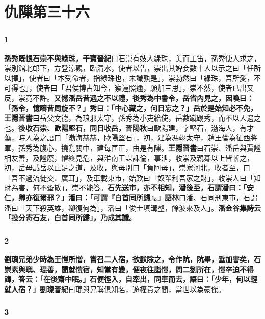 \chapter{仇隟第三十六}

\subsection*{1}

\textbf{孫秀既恨石崇不與綠珠，}{\footnotesize \textbf{干寶晉紀}曰石崇有妓人綠珠，美而工笛，孫秀使人求之，崇別館北邙下，方登涼觀，臨清水，使者以告，崇出其婢妾數十人以示之曰「任所以擇」，使者曰「本受命者，指綠珠也，未識孰是」，崇勃然曰「綠珠，吾所愛，不可得也」，使者曰「君侯博古知今，察遠照邇，願加三思」，崇不然，使者已出又反，崇竟不許。}\textbf{又憾潘岳昔遇之不以禮，後秀為中書令，岳省內見之，因喚曰：「孫令，憶疇昔周旋不？」秀曰：「中心藏之，何日忘之？」岳於是始知必不免，}{\footnotesize \textbf{王隱晉書}曰岳父文德，為琅邪太守，孫秀為小吏給使，岳數蹴蹋秀，而不以人遇之也。}\textbf{後收石崇、歐陽堅石，同日收岳，}{\footnotesize \textbf{晉陽秋}曰歐陽建，字堅石，渤海人，有才藻，時人為之語曰「渤海赫赫，歐陽堅石」，初，建為馮翊太守，趙王倫為征西將軍，孫秀為腹心，撓亂關中，建每匡正，由是有隟。\textbf{王隱晉書}曰石崇、潘岳與賈謐相友善，及謐廢，懼終見危，與淮南王謀誅倫，事泄，收崇及親朞以上皆斬之，初，岳母誡岳以止足之道，及收，與母別曰「負阿母」，崇家河北，收者至，曰「吾不過流徙交、廣耳」，及車載東市，始歎曰「奴輩利吾家之財」，收崇人曰「知財為害，何不蚤散」，崇不能答。}\textbf{石先送市，亦不相知，潘後至，石謂潘曰：「安仁，卿亦復爾邪？」潘曰：「可謂『白首同所歸』。」}{\footnotesize \textbf{語林}曰潘、石同刑東市，石謂潘曰「天下殺英雄，卿復何為」，潘曰「俊士填溝壑，餘波來及人」。}\textbf{潘金谷集詩云「投分寄石友，白首同所歸」，乃成其讖。}

\subsection*{2}

\textbf{劉璵兄弟少時為王愷所憎，嘗召二人宿，欲默除之，令作阬，阬畢，垂加害矣，石崇素與璵、琨善，聞就愷宿，知當有變，便夜往詣愷，問二劉所在，愷卒迫不得諱，答云：「在後齋中眠。」石便徑入，自牽出，同車而去，語曰：「少年，何以輕就人宿？」}{\footnotesize \textbf{劉璨晉紀}曰琨與兄璵俱知名，遊權貴之間，當世以為豪傑。}

\subsection*{3}

